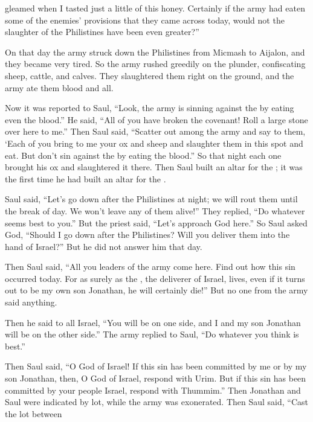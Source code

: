 {gleamed
when
I tasted
just a little
of this
honey.
Certainly if
the army
had eaten
some of the enemies’
provisions
that
they came across
today,
would not
the slaughter
of the Philistines
have been even greater?”
\par }{\PP {}On that day
the army
struck
down the Philistines
from Micmash
to Aijalon,
and they became very
tired.
So
the army
rushed greedily
on the plunder,
confiscating
sheep,
cattle,
and calves.
They slaughtered
them right on the ground,
and the army
ate
them
blood and all.
\par }{\PP {}Now it was reported
to Saul,
“Look,
the army
is sinning
against the
{}
by eating
even the blood.”
He said,
“All of you have broken the covenant! Roll
a large
stone
over here to me.”
Then Saul
said,
“Scatter out
among the army
and say
to them, ‘Each
of you bring
to
me your ox
and sheep
and slaughter
them in this
spot and eat.
But don’t
sin
against
the {}
by eating
the blood.”
So
that night
each
one
brought his ox
and slaughtered
it there.
Then Saul
built
an altar
for the
{}; it was the first
time he had built
an altar
for the
{}.
\par }{\PP {}Saul
said,
“Let’s go down
after
the Philistines
at night;
we will rout
them until
the break of day.
We won’t leave
any of them alive!” They replied,
“Do
whatever
seems
best to
you.” But the priest
said,
“Let’s approach
God
here.”
So Saul
asked
God,
“Should I go down
after
the Philistines? Will
you deliver
them into the hand
of Israel?” But he did not
answer
him that day.
\par }{\PP {}Then Saul
said,
“All
you leaders
of the army
come
here. Find
out how
this
sin
occurred
today.
For
as surely
as the
{}, the deliverer
of Israel,
lives, even
if
it turns
out to be my own son
Jonathan,
he will certainly
die!” But no
one from the army
said
anything.
\par }{\PP {}Then he said
to
all
Israel,
“You
will be
on one
side,
and I
and my son
Jonathan
will be
on the other
side.”
The army
replied
to
Saul,
“Do
whatever
you think is best.”
\par }{\PP {}Then Saul
said,
“O
{}
God
of Israel! If this sin has been committed by me or by my son Jonathan, then, O
{} God of Israel, respond with Urim. But if this sin has been committed by your people Israel, respond with Thummim.” Then Jonathan
and Saul
were indicated by lot, while the army
was exonerated.
Then Saul
said,
“Cast
the lot between
}
